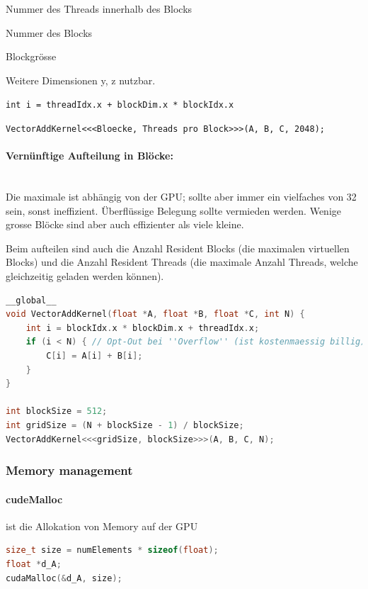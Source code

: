 \begin{description}
	\item[threadIdx.x] Nummer des Threads innerhalb des Blocks
	\item[blockIdx.x] Nummer des Blocks
	\item[blockDim.x] Blockgrösse
	\item Weitere Dimensionen y, z nutzbar.
\end{description}

\lstinline|int i = threadIdx.x + blockDim.x * blockIdx.x|


\lstinline|VectorAddKernel<<<Bloecke, Threads pro Block>>>(A, B, C, 2048);|

\paragraph{Vernünftige Aufteilung in Blöcke:} \hfill \\

Die maximale ist abhängig von der GPU; sollte aber immer ein vielfaches von 32 sein, sonst ineffizient. Überflüssige Belegung sollte vermieden werden. Wenige grosse Blöcke sind aber auch effizienter als viele kleine.

Beim aufteilen sind auch die Anzahl Resident Blocks (die maximalen virtuellen Blocks) und die Anzahl Resident Threads (die maximale Anzahl Threads, welche gleichzeitig geladen werden können).

\begin{lstlisting}[language=C++]
__global__
void VectorAddKernel(float *A, float *B, float *C, int N) {
	int i = blockIdx.x * blockDim.x + threadIdx.x;
	if (i < N) { // Opt-Out bei ''Overflow'' (ist kostenmaessig billig)
		C[i] = A[i] + B[i];
	}
}

int blockSize = 512;
int gridSize = (N + blockSize - 1) / blockSize;
VectorAddKernel<<<gridSize, blockSize>>>(A, B, C, N);
\end{lstlisting}


\subsubsection{Memory management}

\paragraph{cudeMalloc} ist die Allokation von Memory auf der GPU

\begin{lstlisting}[language=C++]
size_t size = numElements * sizeof(float);
float *d_A;
cudaMalloc(&d_A, size);
\end{lstlisting}


